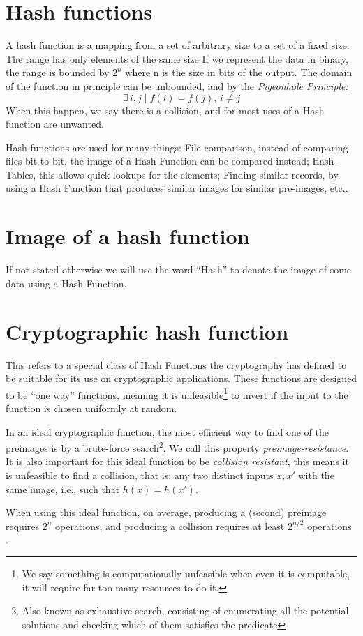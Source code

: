 \section{Hash functions}
A hash function is a mapping from a set of arbitrary size to a set of a fixed
  size.
The range has only elements of the same size
If we represent the data in binary, the range is bounded by $2^n$ where n
  is the size in bits of the output.
The domain of the function in principle can be unbounded, and by the
  \textit{Pigeonhole Principle:}
\begin{equation}
    \exists \, i, j \mid f(i) = f(j), \, i \neq j
\end{equation}
When this happen, we say there is a collision, and for most uses of a Hash
  function are unwanted.

Hash functions are used for many things: File comparison, instead of comparing
  files bit to bit, the image of a Hash Function can be compared instead;
  Hash-Tables, this allows quick lookups for the elements; Finding similar
  records, by using a Hash Function that produces similar images for similar
  pre-images, etc..

\section{Image of a hash function}

If not stated otherwise we will use the word ``Hash'' to denote the image of
  some data using a Hash Function.

\section{Cryptographic hash function}
This refers to a special class of Hash Functions the cryptography has defined
  to be suitable for its use on cryptographic applications. These functions are
  designed to be ``one way'' functions, meaning it is unfeasible\footnote{We %
  say something is computationally unfeasible when even it is computable, it
  will require far too many resources to do it.} to invert if the input to the
  function is chosen uniformly at random.

In an ideal cryptographic function, the most efficient way to find one of the
  preimages is by a brute-force search\footnote{Also known as exhaustive search,
  consisting of enumerating all the potential solutions and checking which of
  them satisfies the predicate}. We call this property
  \textit{preimage-resistance}.
It is also important for this ideal function to be \textit{collision
  resistant}, this means it is unfeasible to find a collision, that is: any two
  distinct inputs $x, x'$ with the same image, i.e., such that $h(x) = h(x')$.

When using this ideal function, on average, producing a (second) preimage
  requires $2^n$ operations, and producing a collision requires at least
  $2^{n / 2} $ operations \cite{preneel1993analysis}.

